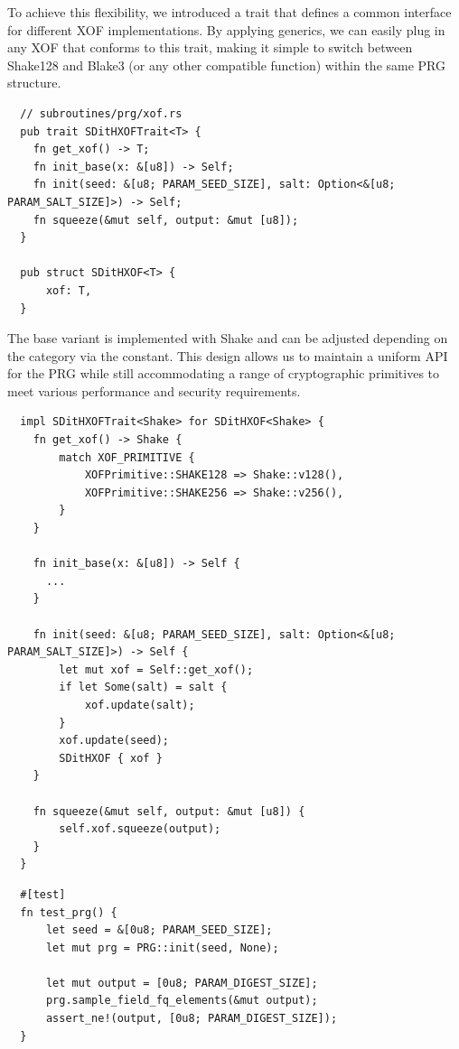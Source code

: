 \documentclass[11pt]{report}
\theoremstyle{definition}
\theoremstyle{plain}
\begin{document}
To achieve this flexibility, we introduced a trait that defines a common interface for different XOF implementations. By applying generics, we can easily plug in any XOF that conforms to this trait, making it simple to switch between Shake128 and Blake3 (or any other compatible function) within the same PRG structure.

\clearpage

\begin{verbatim}
  // subroutines/prg/xof.rs
  pub trait SDitHXOFTrait<T> {
    fn get_xof() -> T;
    fn init_base(x: &[u8]) -> Self;
    fn init(seed: &[u8; PARAM_SEED_SIZE], salt: Option<&[u8; PARAM_SALT_SIZE]>) -> Self;
    fn squeeze(&mut self, output: &mut [u8]);
  }

  pub struct SDitHXOF<T> {
      xof: T,
  }
\end{verbatim}

The base variant is implemented with Shake and can be adjusted depending on the category via the  constant. This design allows us to maintain a uniform API for the PRG while still accommodating a range of cryptographic primitives to meet various performance and security requirements.

\begin{verbatim}
  impl SDitHXOFTrait<Shake> for SDitHXOF<Shake> {
    fn get_xof() -> Shake {
        match XOF_PRIMITIVE {
            XOFPrimitive::SHAKE128 => Shake::v128(),
            XOFPrimitive::SHAKE256 => Shake::v256(),
        }
    }

    fn init_base(x: &[u8]) -> Self {
      ...
    }

    fn init(seed: &[u8; PARAM_SEED_SIZE], salt: Option<&[u8; PARAM_SALT_SIZE]>) -> Self {
        let mut xof = Self::get_xof();
        if let Some(salt) = salt {
            xof.update(salt);
        }
        xof.update(seed);
        SDitHXOF { xof }
    }

    fn squeeze(&mut self, output: &mut [u8]) {
        self.xof.squeeze(output);
    }
  }
\end{verbatim}

\begin{verbatim}
  #[test]
  fn test_prg() {
      let seed = &[0u8; PARAM_SEED_SIZE];
      let mut prg = PRG::init(seed, None);

      let mut output = [0u8; PARAM_DIGEST_SIZE];
      prg.sample_field_fq_elements(&mut output);
      assert_ne!(output, [0u8; PARAM_DIGEST_SIZE]);
  }
\end{verbatim}
\end{document}
